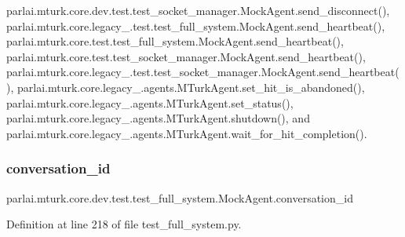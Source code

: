 parlai.\+mturk.\+core.\+dev.\+test.\+test\+\_\+socket\+\_\+manager.\+Mock\+Agent.\+send\+\_\+disconnect(), parlai.\+mturk.\+core.\+legacy\+\_.\+test.\+test\+\_\+full\+\_\+system.\+Mock\+Agent.\+send\+\_\+heartbeat(), parlai.\+mturk.\+core.\+test.\+test\+\_\+full\+\_\+system.\+Mock\+Agent.\+send\+\_\+heartbeat(), parlai.\+mturk.\+core.\+test.\+test\+\_\+socket\+\_\+manager.\+Mock\+Agent.\+send\+\_\+heartbeat(), parlai.\+mturk.\+core.\+legacy\+\_.\+test.\+test\+\_\+socket\+\_\+manager.\+Mock\+Agent.\+send\+\_\+heartbeat(), parlai.\+mturk.\+core.\+legacy\+\_.\+agents.\+M\+Turk\+Agent.\+set\+\_\+hit\+\_\+is\+\_\+abandoned(), parlai.\+mturk.\+core.\+legacy\+\_.\+agents.\+M\+Turk\+Agent.\+set\+\_\+status(), parlai.\+mturk.\+core.\+legacy\+\_.\+agents.\+M\+Turk\+Agent.\+shutdown(), and parlai.\+mturk.\+core.\+legacy\+\_.\+agents.\+M\+Turk\+Agent.\+wait\+\_\+for\+\_\+hit\+\_\+completion().

\mbox{\label{classparlai_1_1mturk_1_1core_1_1dev_1_1test_1_1test__full__system_1_1MockAgent_a6b4ad0e9af22d12396f4b7a2a9a6d11d}} 
\subsubsection{\texorpdfstring{conversation\+\_\+id}{conversation\_id}}
{\footnotesize\ttfamily parlai.\+mturk.\+core.\+dev.\+test.\+test\+\_\+full\+\_\+system.\+Mock\+Agent.\+conversation\+\_\+id}



Definition at line 218 of file test\+\_\+full\+\_\+system.\+py.



